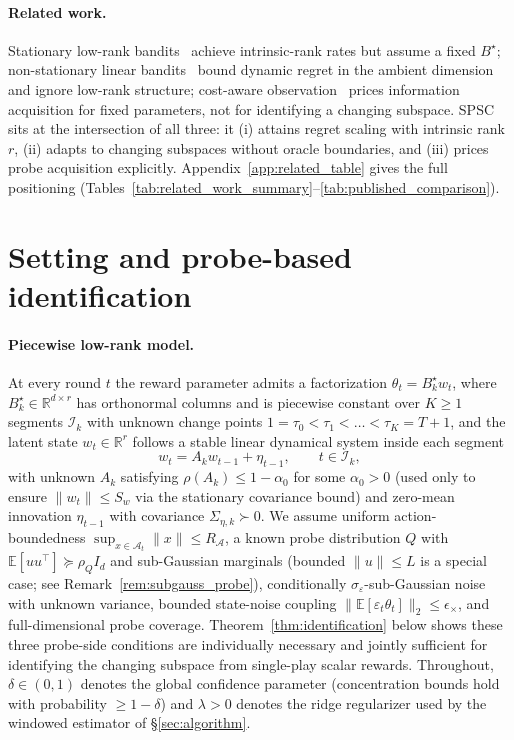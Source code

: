 \documentclass{article}
\newcommand{\R}{\mathbb{R}}
\newcommand{\E}{\mathbb{E}}
\newcommand{\cA}{\mathcal{A}}
\newcommand{\cI}{\mathcal{I}}
\begin{document}
\paragraph{Related work.}
Stationary low-rank
bandits~\citep{jun2019bilinear,kang2022efficient,jedra2024low,jang2024efficient,stojanovic2023spectral,duong2024beyond,lu2021low}
achieve intrinsic-rank rates but assume a fixed $B^\star$;
non-stationary linear
bandits~\citep{russac2019weighted,cheung2019learning,abbasi2023new,hou2024almost}
bound dynamic regret in the ambient dimension and ignore low-rank
structure; cost-aware
observation~\citep{seldin2014prediction,tucker2023bandits,elumar2024multi}
prices information acquisition for fixed parameters, not for
identifying a changing subspace. SPSC sits at the intersection of
all three: it (i) attains regret scaling with intrinsic rank $r$,
(ii) adapts to changing subspaces without oracle boundaries, and
(iii) prices probe acquisition explicitly.
Appendix~\ref{app:related_table} gives the full positioning
(Tables~\ref{tab:related_work_summary}--\ref{tab:published_comparison}).

\section{Setting and probe-based identification}
\label{sec:setting}

\paragraph{Piecewise low-rank model.}
At every round $t$ the reward parameter admits a factorization
$\theta_t = B_k^\star w_t$, where $B_k^\star \in \R^{d\times r}$ has
orthonormal columns and is piecewise constant over $K\ge 1$ segments
$\cI_k$ with unknown change points
$1=\tau_0<\tau_1<\dots<\tau_K=T{+}1$, and the latent state $w_t\in
\R^r$ follows a stable linear dynamical system inside each segment
\[
 w_t = A_k w_{t-1} + \eta_{t-1}, \qquad t \in \cI_k,
\]
with unknown $A_k$ satisfying $\rho(A_k)\le 1{-}\alpha_0$ for some
$\alpha_0>0$ (used only to ensure $\|w_t\|\le S_w$ via the stationary
covariance bound) and zero-mean innovation $\eta_{t-1}$ with
covariance $\Sigma_{\eta,k}\succ 0$. We
assume uniform action-boundedness $\sup_{x\in\cA_t}\|x\|\le R_\cA$,
a known probe distribution $Q$ with $\E[uu^\top]\succeq \rho_Q I_d$ and
sub-Gaussian marginals (bounded $\|u\|\le L$ is a special case; see
Remark~\ref{rem:subgauss_probe}), conditionally
$\sigma_\varepsilon$-sub-Gaussian noise with unknown variance, bounded
state-noise coupling
$\|\E[\varepsilon_t\theta_t]\|_2 \le \epsilon_\times$, and
full-dimensional probe coverage. Theorem~\ref{thm:identification}
below shows these three probe-side conditions are individually
necessary and jointly sufficient for identifying the changing
subspace from single-play scalar rewards. Throughout, $\delta\in(0,1)$
denotes the global confidence parameter (concentration bounds hold
with probability $\ge 1-\delta$) and $\lambda>0$ denotes the ridge
regularizer used by the windowed estimator of \S\ref{sec:algorithm}.
\end{document}
